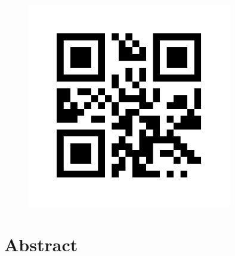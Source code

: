 \documentclass{report} %
\begin{document}
\newpage %


\begin{figure}[h]
    \includegraphics[width=0.8\textwidth]{./ReportImages/qrcode.png} %
    \label{fig:your-image}
\end{figure}

\newpage %

\chapter*{Abstract}
\end{document}
